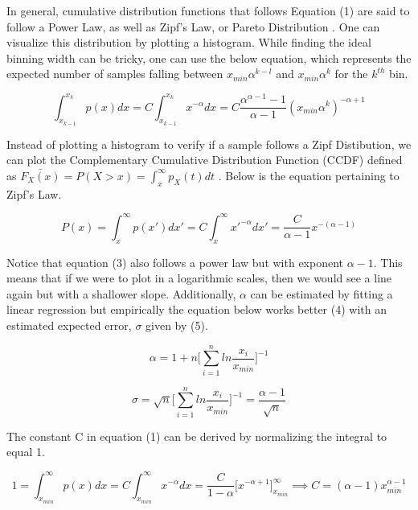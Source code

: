 \documentclass[12pt]{article}
\begin{document}
In general, cumulative distribution functions that follows Equation (1) are said to follow a Power Law, as well as  Zipf's Law, or Pareto Distribution \cite{newman2005power}. One can visualize this distribution by plotting a histogram. While finding the ideal binning width can be tricky, one can use the below equation, which represents the expected number of samples falling between $x_{min}\alpha^{k-l}$ and $x_{min}\alpha^k$ for the $k^{th}$ bin.


\begin{equation}
    \int_{x_{k-1}}^{x_k} p(x) dx = C  \int_{x_{k-1}}^{x_k} x^{-\alpha} dx = C \frac{{\alpha^{\alpha -1} - 1}}{{\alpha - 1}}(x_{min}\alpha^k)^{-\alpha + 1}
\end{equation}

Instead of plotting a histogram to verify if a sample follows a Zipf Distibution, we can plot the Complementary Cumulative Distribution Function (CCDF) defined as $\bar{F_X(x)} = P(X > x) = \int_x^\infty p_X(t) dt$ . Below is the equation pertaining to Zipf's Law.

\begin{equation}
    P(x) = \int_{x}^{\infty} p(x') dx' = C\int_{x}^{\infty} x'^{-\alpha} dx' = \frac{C}{\alpha - 1}x^{-(\alpha-1)}
\end{equation}

Notice that equation (3) also follows a power law but with exponent $\alpha - 1$. This means that if we were to plot in a logarithmic scales, then we would see a line again but with a shallower slope. Additionally, $\alpha$ can be estimated by fitting a linear regression but empirically the equation below works better (4) with an estimated expected error, $\sigma$ given by (5).


\begin{equation}
    \alpha = 1 + n\bigg[ \sum_{i=1}^{n} ln \frac{x_i}{x_{min}}\bigg]^{-1}
\end{equation}


\begin{equation}
    \sigma = \sqrt{n}\bigg[ \sum_{i=1}^{n} ln \frac{x_i}{x_{min}}\bigg]^{-1} = \frac{\alpha - 1}{\sqrt{n}}
\end{equation}

The constant C in equation (1) can be derived by normalizing the integral to equal 1. 

\begin{equation}
    1 = \int_{x_{min}}^{\infty} p(x) dx = C\int_{x_{min}}^{\infty} x^{-\alpha} dx = \frac{C}{1 - \alpha} \bigg[ x^{- \alpha + 1} \bigg ]_{x_{min}}^{\infty}
    \implies C = (\alpha - 1)x^{\alpha-1}_{min}
\end{equation}
\end{document}
